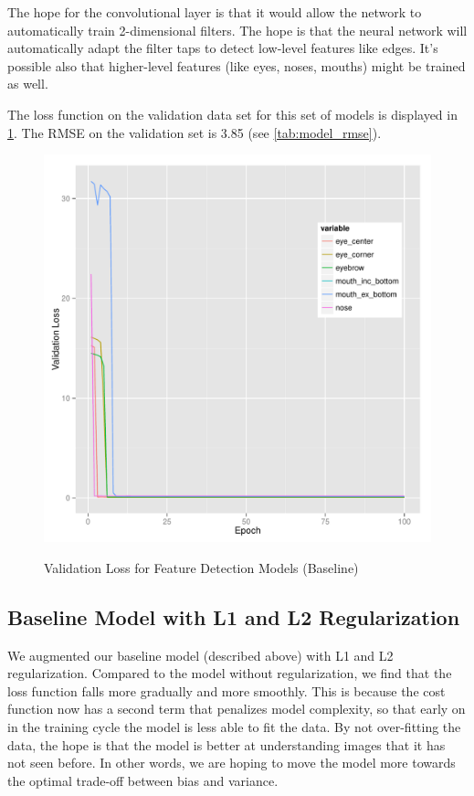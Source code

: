 \documentclass[journal]{IEEEtran}
\begin{document}
The hope for the convolutional layer is that it would allow the network to automatically train 2-dimensional filters.  The hope is that the neural network will automatically adapt the filter taps to detect low-level features like edges.  It's possible also that higher-level features (like eyes, noses, mouths) might be trained as well.

The loss function on the validation data set for this set of models is displayed in \cref{fig:val_loss_default}. The RMSE on the validation set is 3.85 (see \cref{tab:model_rmse}).

\begin{figure}[!htb]
  \centering
  \caption{Validation Loss for Feature Detection Models (Baseline)}
  \includegraphics[scale=.49]{val_loss_default.pdf}
  \label{fig:val_loss_default}
\end{figure}

\subsection{Baseline Model with L1 and L2 Regularization}

We augmented our baseline model (described above) with L1 and L2 regularization. Compared to the model without regularization, we find that the loss function falls more gradually and more smoothly. This is because the cost function now has a second term that penalizes model complexity, so that early on in the training cycle the model is less able to fit the data. By not over-fitting the data, the hope is that the model is better at understanding images that it has not seen before. In other words, we are hoping to move the model more towards the optimal trade-off between bias and variance.
\end{document}
